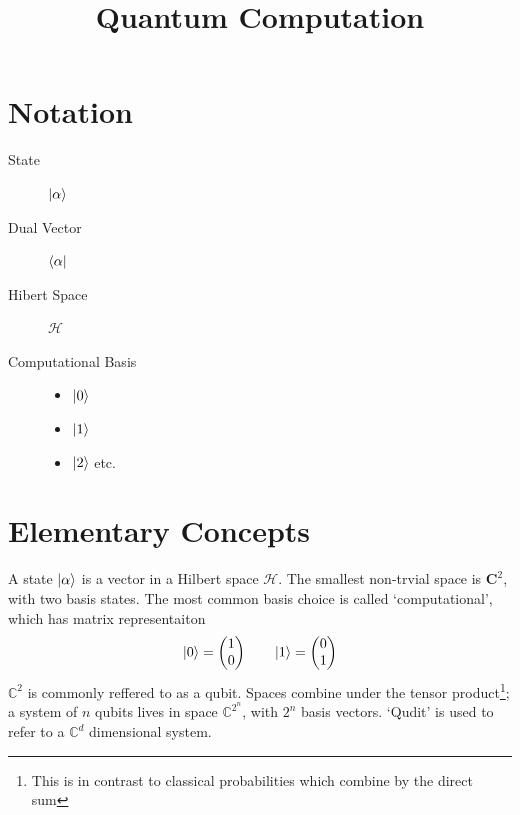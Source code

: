 \documentclass[11pt]{article}
\begin{document}
\title{Quantum Computation}
\maketitle
\section*{Notation}
\begin{description}
    \item [State] $\ket{\alpha}$
    \item [Dual Vector] $\bra{\alpha}$
    \item [Hibert Space] $\mathcal{H}$
    \item [Computational Basis] \hfill
    \begin{itemize}
        \item $\ket{0}$
        \item $\ket{1}$
        \item $\ket{2}$ etc.
    \end{itemize}
\end{description}
\section{Elementary Concepts}
A state $\ket{\alpha}$ is a vector in a Hilbert space $\mathcal{H}$. The smallest non-trvial space is $\mathbf{C}^{2}$, with two basis states. The most common basis choice is called `computational', which has matrix representaiton
\begin{align*}
    \ket{0} = \begin{pmatrix}
                    1 \\
                    0 \\
                \end{pmatrix} \qquad
    \ket{1} = \begin{pmatrix}
                    0 \\
                    1 \\
                \end{pmatrix} \\
\end{align*}
$\mathbb{C}^{2}$ is commonly reffered to as a qubit. Spaces combine under the tensor product\footnote{This is in contrast to classical probabilities which combine by the direct sum}; a system of $n$ qubits lives in space $\mathbb{C}^{2^{n}}$, with $2^{n}$ basis vectors. `Qudit' is used to refer to a $\mathbb{C}^{d}$ dimensional system.
\end{document}
